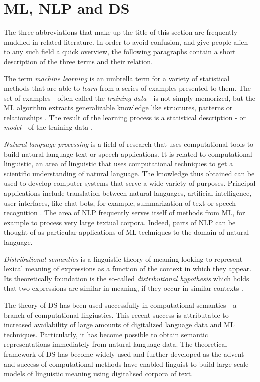 \documentclass{article}
\begin{document}
\section{ML, NLP and DS}\hypertarget{sec2}{ }
The three abbreviations that make up the title of this section are frequently muddled in related literature. In order to avoid confusion, and give people alien to any such field a quick overview, the following paragraphs contain a short description of the three terms and their relation.
 
The term \emph{machine learning} is an umbrella term for a variety of statistical methods that are able to \emph{learn} from a series of examples presented to them. The set of examples - often called the \emph{training data} - is not simply memorized, but the ML algorithm extracts generalizable knowledge like structures, patterns or relationships \cite{domingos2012few}.
The result of the learning process is a statistical description - or \emph{model} - of the training data \cite{fayyad2001digital}.

\emph{Natural language processing} is a field of research that uses computational tools to build natural language text or speech applications. It is related to computational linguistic, an area of linguistic that uses computational techniques to get a scientific understanding of natural language. The knowledge thus obtained can be used  to develop computer systems that serve a wide variety of purposes. Principal applications include translation between natural languages, artificial intelligence, user interfaces, like chat-bots, for example, summarization of text or speech recognition \cite{chowdhury2003natural}. The area of NLP frequently serves itself of methods from ML, for example to process very large textual corpora. Indeed, parts of NLP can be thought of as particular applications of ML techniques to the domain of natural language.

\emph{Distributional semantics} is a linguistic theory of meaning looking to represent lexical meaning of expressions as a function of the context in which they appear. Its theoretically foundation is the so-called \emph{distributional hypothesis} which holds that two expressions are similar in meaning, if they occur in similar contexts \cite{harris1954distributional}.

The theory of DS has been used successfully in computational semantics - a branch of computational lingiustics. This recent success is attributable to increased availability of large amounts of digitalized language data and ML techniques. Particularly, it has become possible to obtain semantic representations immediately from natural language data. The theoretical framework of DS has become widely used and further developed as the advent and success of computational methods have enabled linguist to build large-scale models of linguistic meaning using digitalised corpora of text. 
\end{document}
